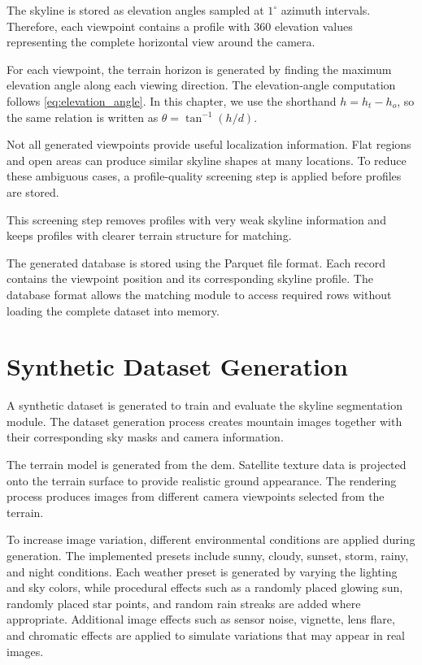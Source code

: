 The skyline is stored as elevation angles sampled at $1^\circ$ azimuth intervals. Therefore, each viewpoint contains a profile with 360 elevation values representing the complete horizontal view around the camera.

For each viewpoint, the terrain horizon is generated by finding the maximum elevation angle along each viewing direction. The elevation-angle computation follows \cref{eq:elevation_angle}. In this chapter, we use the shorthand $h = h_t - h_o$, so the same relation is written as $\theta = \tan^{-1}(h/d)$.

Not all generated viewpoints provide useful localization information. Flat regions and open areas can produce similar skyline shapes at many locations. To reduce these ambiguous cases, a profile-quality screening step is applied before profiles are stored.

This screening step removes profiles with very weak skyline information and keeps profiles with clearer terrain structure for matching.

The generated database is stored using the Parquet file format. Each record contains the viewpoint position and its corresponding skyline profile. The database format allows the matching module to access required rows without loading the complete dataset into memory.

\section{Synthetic Dataset Generation}

A synthetic dataset is generated to train and evaluate the skyline segmentation module. The dataset generation process creates mountain images together with their corresponding sky masks and camera information.

The terrain model is generated from the \gls{dem}. Satellite texture data is projected onto the terrain surface to provide realistic ground appearance. The rendering process produces images from different camera viewpoints selected from the terrain.

To increase image variation, different environmental conditions are applied during generation. The implemented presets include sunny, cloudy, sunset, storm, rainy, and night conditions. Each weather preset is generated by varying the lighting and sky colors, while procedural effects such as a randomly placed glowing sun, randomly placed star points, and random rain streaks are added where appropriate. Additional image effects such as sensor noise, vignette, lens flare, and chromatic effects are applied to simulate variations that may appear in real images.

